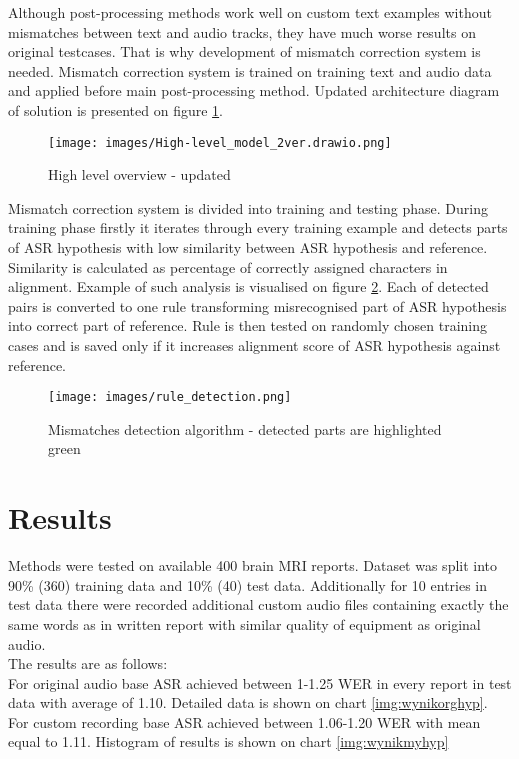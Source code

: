 \documentclass[a4paper,11pt,twoside]{report}
\theoremstyle{definition}
\begin{document}
Although post-processing methods work well on custom text examples without mismatches between text and audio tracks, they have much worse results on original testcases. That is why development of mismatch correction system is needed. Mismatch correction system is trained on training text and audio data and applied before main post-processing method. Updated architecture diagram of solution is presented on figure \ref{img:overview2}.

\begin{figure}[H]{}
    \centering
    \texttt{[image: images/High-level\_model\_2ver.drawio.png]}
    \caption{High level overview - updated}
    \label{img:overview2}
\end{figure}

Mismatch correction system is divided into training and testing phase. During training phase firstly it iterates through every training example and detects parts of ASR hypothesis with low similarity between ASR hypothesis and reference. Similarity is calculated as percentage of correctly assigned characters in alignment. Example of such analysis is visualised on figure \ref{img:mismatch}. Each of detected pairs is converted to one rule transforming misrecognised part of ASR hypothesis into correct part of reference. Rule is then tested on randomly chosen training cases and is saved only if it increases alignment score of ASR hypothesis against reference. 



\begin{figure}[H]{}
    \centering
    \texttt{[image: images/rule\_detection.png]}
    \caption{Mismatches detection algorithm - detected parts are highlighted green}
    \label{img:mismatch}
\end{figure}



\chapter{Results}

Methods were tested on available 400 brain MRI reports. Dataset was split into 90\% (360) training data and 10\% (40) test data. Additionally for 10 entries in test data there were recorded additional custom audio files containing exactly the same words as in written report with similar quality of equipment as original audio.\\
The results are as follows:\\
For original audio base ASR achieved between 1-1.25 WER in every report in test data with average of 1.10. Detailed data is shown on chart \ref{img:wynikorghyp}. For custom recording base ASR achieved between 1.06-1.20 WER with mean equal to 1.11. Histogram of results is shown on chart \ref{img:wynikmyhyp}\\
\end{document}
